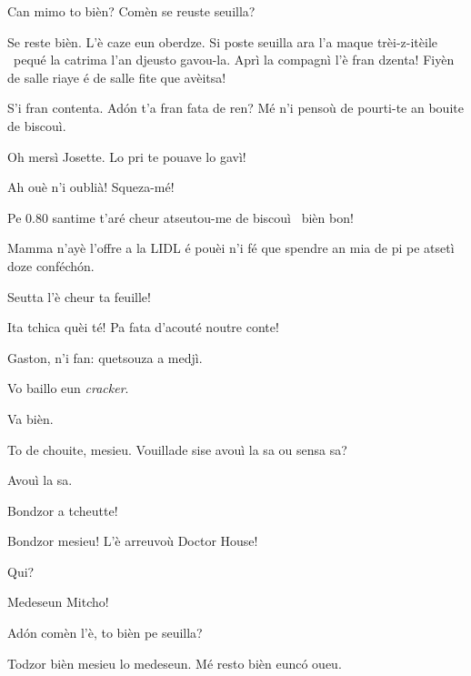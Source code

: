 \begin{drama}
\Feliespeaks Can mimo to bièn? Comèn se reuste seuilla?

\Gerominespeaks {} Se reste bièn. L’è caze eun o\-ber\-dze. Si poste seuilla ara l’a maque trèi-z-itèile \stella\ pequé la catrima l’an djeusto gavou-la.  Aprì la compagnì l’è fran dzenta! Fiyèn de salle riaye é de salle fite que avèitsa!

\Feliespeaks S’i fran contenta. Ad\'on t’a fran fata de ren? Mé n'i pensoù de pourti-te an bouite de biscouì.

\Gerominespeaks Oh mersì Josette.  Lo pri te pouave lo gavì!

\Feliespeaks Ah ouè n’i oublià! Squeza-mé!

\Gerominespeaks Pe $0.80$ santime t’aré cheur atseutou-me de biscouì \biscotto\ bièn bon!

\Feliespeaks Mamma n’ayè l’offre a la LIDL é pouèi n’i fé que spendre an mia de pi pe atsetì doze conféch\'on.

\Casimirspeaks Seutta l’è cheur ta feuille!

\Gerominespeaks Ita tchica quèi té! Pa fata d'acouté noutre conte!

\PersEmpourtantaspeaks {} Gaston, n’i fan: quetsouza a medjì.

\Eunfeurmispeaks Vo baillo eun \textit{cracker}. 

\PersEmpourtantaspeaks Va bièn.

\Eunfeurmispeaks To de chouite, mesieu. Vouillade sise avouì la sa ou sensa sa?

\PersEmpourtantaspeaks Avouì la sa. 



\MedMitchospeaks Bondzor a tcheutte!

\Eunfeurmispeaks  Bondzor mesieu! L'è arreuvoù Doctor House!

\Casimirspeaks Qui?

\Eunfeurmispeaks Medeseun Mitcho!

\MedMitchospeaks Ad\'on comèn l'è, to bièn pe seuilla?

\Gerominespeaks Todzor bièn mesieu lo medeseun. Mé resto bièn eunc\'o oueu.


\end{drama}
